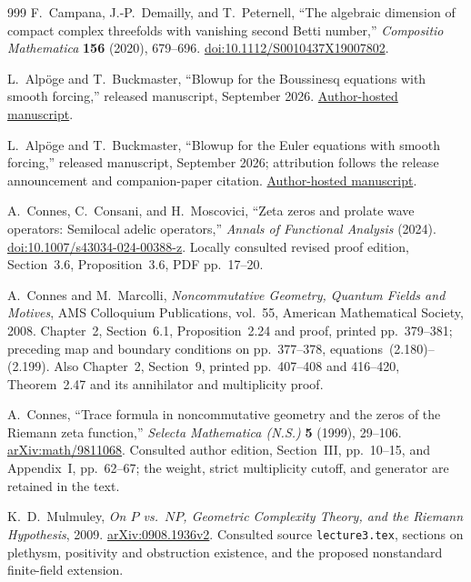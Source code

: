 \begin{thebibliography}{999}
F.~Campana, J.-P.~Demailly, and T.~Peternell,
``The algebraic dimension of compact complex threefolds with vanishing
second Betti number,'' \emph{Compositio Mathematica} \textbf{156}
(2020), 679--696.
\href{https://doi.org/10.1112/S0010437X19007802}{doi:10.1112/S0010437X19007802}.

L.~Alp\"oge and T.~Buckmaster,
``Blowup for the Boussinesq equations with smooth forcing,''
released manuscript, September 2026.
\href{https://cims.nyu.edu/~tristanb/boussinesq.pdf}{Author-hosted manuscript}.

L.~Alp\"oge and T.~Buckmaster,
``Blowup for the Euler equations with smooth forcing,''
released manuscript, September 2026; attribution follows the release
announcement and companion-paper citation.
\href{https://cims.nyu.edu/~tristanb/euler.pdf}{Author-hosted manuscript}.

A.~Connes, C.~Consani, and H.~Moscovici,
``Zeta zeros and prolate wave operators: Semilocal adelic operators,''
\emph{Annals of Functional Analysis} (2024).
\href{https://doi.org/10.1007/s43034-024-00388-z}{doi:10.1007/s43034-024-00388-z}.
Locally consulted revised proof edition, Section~3.6, Proposition~3.6,
PDF pp.~17--20.

A.~Connes and M.~Marcolli,
\emph{Noncommutative Geometry, Quantum Fields and Motives},
AMS Colloquium Publications, vol.~55, American Mathematical Society, 2008.
Chapter~2, Section~6.1, Proposition~2.24 and proof,
printed pp.~379--381; preceding map and boundary conditions on
pp.~377--378, equations~(2.180)--(2.199).
Also Chapter~2, Section~9, printed pp.~407--408 and 416--420,
Theorem~2.47 and its annihilator and multiplicity proof.

A.~Connes,
``Trace formula in noncommutative geometry and the zeros of the
Riemann zeta function,'' \emph{Selecta Mathematica (N.S.)}
\textbf{5} (1999), 29--106.
\href{https://arxiv.org/abs/math/9811068}{arXiv:math/9811068}.
Consulted author edition, Section~III, pp.~10--15, and Appendix~I,
pp.~62--67; the weight, strict multiplicity cutoff, and generator
are retained in the text.

K.~D.~Mulmuley,
\emph{On $P$ vs.~$NP$, Geometric Complexity Theory, and the Riemann Hypothesis},
2009. \href{https://arxiv.org/abs/0908.1936v2}{arXiv:0908.1936v2}.
Consulted source \texttt{lecture3.tex}, sections on plethysm,
positivity and obstruction existence, and the proposed nonstandard
finite-field extension.


\end{thebibliography}
